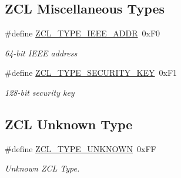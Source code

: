 \subsection*{Z\-C\-L Miscellaneous Types}
\begin{DoxyCompactItemize}
\item 
\hypertarget{group__zcl__types_ga13bc9499fe6127a5ce30c31f3ccae2df}{\#define \hyperlink{group__zcl__types_ga13bc9499fe6127a5ce30c31f3ccae2df}{Z\-C\-L\-\_\-\-T\-Y\-P\-E\-\_\-\-I\-E\-E\-E\-\_\-\-A\-D\-D\-R}~0x\-F0}\label{group__zcl__types_ga13bc9499fe6127a5ce30c31f3ccae2df}

\begin{DoxyCompactList}\small\item\em 64-\/bit I\-E\-E\-E address \end{DoxyCompactList}\item 
\hypertarget{group__zcl__types_gaa430fee3f4e5e09767b9fc969f73cf2f}{\#define \hyperlink{group__zcl__types_gaa430fee3f4e5e09767b9fc969f73cf2f}{Z\-C\-L\-\_\-\-T\-Y\-P\-E\-\_\-\-S\-E\-C\-U\-R\-I\-T\-Y\-\_\-\-K\-E\-Y}~0x\-F1}\label{group__zcl__types_gaa430fee3f4e5e09767b9fc969f73cf2f}

\begin{DoxyCompactList}\small\item\em 128-\/bit security key \end{DoxyCompactList}\end{DoxyCompactItemize}
\subsection*{Z\-C\-L Unknown Type}
\begin{DoxyCompactItemize}
\item 
\hypertarget{group__zcl__types_ga856105c2b5037b8406a294b668dfe755}{\#define \hyperlink{group__zcl__types_ga856105c2b5037b8406a294b668dfe755}{Z\-C\-L\-\_\-\-T\-Y\-P\-E\-\_\-\-U\-N\-K\-N\-O\-W\-N}~0x\-F\-F}\label{group__zcl__types_ga856105c2b5037b8406a294b668dfe755}

\begin{DoxyCompactList}\small\item\em Unknown Z\-C\-L Type. \end{DoxyCompactList}\end{DoxyCompactItemize}

